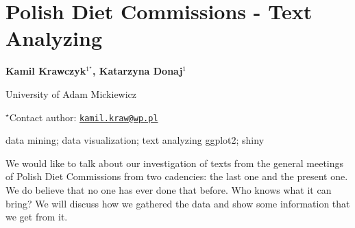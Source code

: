 \documentclass[\main/boa.tex]{subfiles}
\begin{document}
\section{Polish Diet Commissions - Text Analyzing}

\begin{center}
  {\bf Kamil Krawczyk$^{1^\star}$, Katarzyna Donaj$^{1}$}
\end{center}

\vskip 0.3cm

\begin{affiliations}
\begin{enumerate}
\begin{minipage}{0.915\textwidth}
\centering
\item University of Adam Mickiewicz \\[-2pt]
\end{minipage}
\end{enumerate}
$^\star$Contact author: \href{mailto:kamil.kraw@wp.pl}{\nolinkurl{kamil.kraw@wp.pl}}\\
\end{affiliations}

\vskip 0.5cm

\begin{minipage}{0.915\textwidth}
\keywords data mining; data visualization; text analyzing
\packages ggplot2; shiny
\end{minipage}

\vskip 0.8cm

We would like to talk about our investigation of texts from the general
meetings of Polish Diet Commissions from two cadencies: the last one and
the present one. We do believe that no one has ever done that before.
Who knows what it can bring? We will discuss how we gathered the data
and show some information that we get from it.
\end{document}

